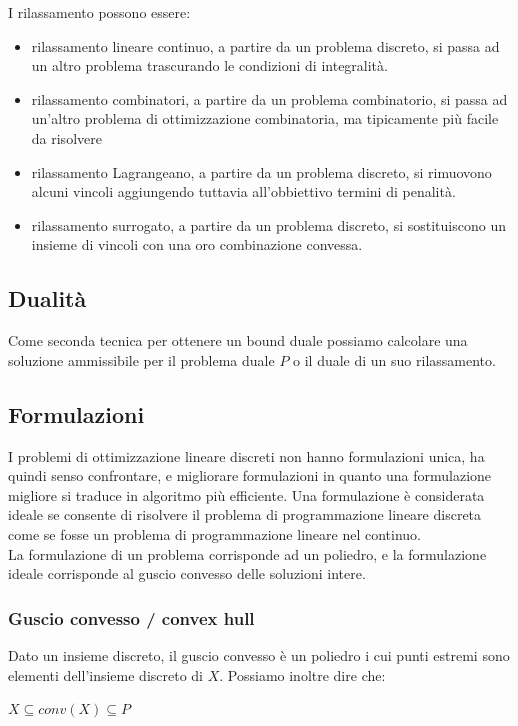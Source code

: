 \documentclass[11pt, oneside]{article}   	%
\begin{document}
I rilassamento possono essere:
\begin{itemize}
\item rilassamento lineare continuo, a partire da un problema discreto, si passa ad un altro problema trascurando le condizioni di integralità.
\item rilassamento combinatori, a partire da un problema combinatorio, si passa ad un'altro problema di ottimizzazione combinatoria, ma tipicamente più facile da risolvere
\item rilassamento Lagrangeano, a partire da un problema discreto, si rimuovono alcuni vincoli aggiungendo tuttavia all'obbiettivo termini di penalità.
\item rilassamento surrogato, a partire da un problema discreto, si sostituiscono un insieme di vincoli con una oro combinazione convessa.
\end{itemize}
\subsection{Dualità}
Come seconda tecnica per ottenere un bound duale possiamo calcolare una soluzione ammissibile per il problema duale $P$ o il duale di un suo rilassamento.

\subsection{Formulazioni}
I problemi di ottimizzazione lineare discreti non hanno formulazioni unica, ha quindi senso confrontare, e migliorare formulazioni in quanto una formulazione migliore si traduce in algoritmo più efficiente.
Una formulazione è considerata ideale se consente di risolvere il problema di programmazione lineare discreta come se fosse un problema di programmazione lineare nel continuo.\\

La formulazione di un problema corrisponde ad un poliedro, e la formulazione ideale corrisponde al guscio convesso delle soluzioni intere.

\subsubsection{Guscio convesso  /  convex hull}
Dato un insieme discreto, il guscio convesso è un poliedro i cui punti estremi sono elementi dell'insieme discreto di $X$. Possiamo inoltre dire che:
\begin{center}
$X \subseteq conv(X) \subseteq P$
\end{center}
\end{document}
